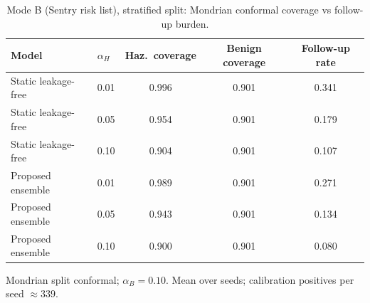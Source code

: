 \begin{table}[t]
\centering
\small
\caption{Mode B (Sentry risk list), stratified split: Mondrian conformal coverage vs follow-up burden.}
\label{tab:conf_sentry_stratified}
\begin{tabular}{llccc}
\toprule
Model & $\alpha_H$ & Haz.\ coverage & Benign coverage & Follow-up rate \\
\midrule
Static leakage-free & 0.01 & 0.996 & 0.901 & 0.341 \\
Static leakage-free & 0.05 & 0.954 & 0.901 & 0.179 \\
Static leakage-free & 0.10 & 0.904 & 0.901 & 0.107 \\
\midrule
Proposed ensemble & 0.01 & 0.989 & 0.901 & 0.271 \\
Proposed ensemble & 0.05 & 0.943 & 0.901 & 0.134 \\
Proposed ensemble & 0.10 & 0.900 & 0.901 & 0.080 \\
\bottomrule
\end{tabular}
\par\vspace{2pt}\footnotesize Mondrian split conformal; $\alpha_B=0.10$. Mean over seeds; calibration positives per seed $\approx 339$.
\end{table}
